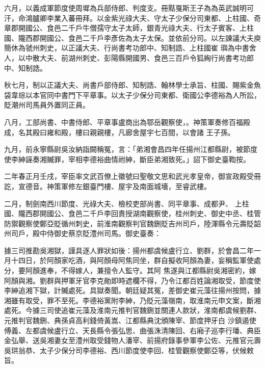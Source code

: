 \begin{pinyinscope}
 六月，以義成軍節度使周墀為兵部侍郎、判度支。冊黠戛斯王子為為英武誠明可汗，命鴻臚卿李業入蕃冊拜。以金紫光祿大夫、守太子少保分司東都、上柱國、奇章郡開國公、食邑二千戶牛僧孺守太子太師，銀青光祿大夫、行太子賓客、上柱國、隴西郡開國公、食邑二千戶李彥佐為太子太保。並依前分司。以左諫議大夫庾簡休為虢州刺史，以正議大夫、行尚書考功郎中、知制誥、上柱國崔
 璵為中書舍人，以中散大夫、前湖州刺史、彭陽縣開國男、食邑三百戶令狐綯行尚書考功郎中、知制誥。



 秋七月，制以正議大夫、尚書戶部侍郎、知制誥、翰林學士承旨、柱國、賜紫金魚袋韋琮以本官同中書門下平章事。以太子少保分司東都、衛國公李德裕為人所訟，貶潮州司馬員外置同正員。



 八月，工部尚書、中書侍郎、平章事盧商出為鄂岳觀察使，。神策軍奏修百福殿成，名其殿曰雍和殿，樓曰親親樓，凡廊舍屋宇七百間，以會諸
 王子孫。



 九月，前永寧縣尉吳汝納詣闕稱冤，言：「弟湘會昌四年任揚州江都縣尉，被節度使李紳誣奏湘贓罪，宰相李德裕曲情祔紳，斷臣弟湘致死。」詔下御史臺鞫按。



 二年春正月壬戌，宰臣率文武百僚上徽號曰聖敬文思和武光孝皇帝，御宣政殿受冊訖，宣德音。神策軍修左銀臺門樓、屋宇及南面城墻，至睿武樓。



 二月，制劍南西川節度、光祿大夫、檢校吏部尚書、同平章事、成都尹、
 上柱國、隴西郡開國公、食邑二千戶李回責授湖南觀察使，桂州刺史、御史中丞、桂管防禦觀察使鄭亞貶循州刺史，前淮南觀察判官魏鉶貶吉州司戶，陸渾縣令元壽貶韶州司戶，殿中侍御史蔡京貶澧州司馬。御史臺奏：



 據三司推勘吳湘獄，謹具逐人罪狀如後：揚州都虞候盧行立、劉群，於會昌二年一月十四日，於阿顏家吃酒，與阿顏母阿焦同坐，群自擬收阿顏為妻，妄稱監軍使處分，要阿顏進奉，不得嫁人，兼擅令人監守。其阿
 焦遂與江都縣尉吳湘密約，嫁阿顏與湘。劉群與押軍牙官李克勛即時遮欄不得，乃令江都百姓論湘取受，節度使李紳追湘下獄，計贓處死。具獄奏聞。朝廷疑其冤，差御史崔元藻往揚州按問，據湘雖有取受，罪不至死。李德裕黨附李紳，乃貶元藻嶺南，取淮南元申文案，斷湘處死。今據三司使追崔元藻及淮南元推判官魏鉶並關連人款狀，淮南都虞候劉群、元推判官魏鉶、典孫貞高利錢倚黃嵩、江都縣典沈頒陳宰、節度押牙白
 沙鎮遏使傅義、左都虞候盧行立、天長縣令張弘思、曲張洙清陳回、右廂子巡李行璠、典臣金弘舉、送吳湘妻女至澧州取受錢物人潘宰、前揚府錄事參軍李公佐、元推官元壽吳珙翁恭、太子少保分司李德裕、西川節度使李回、桂管觀察使鄭亞等，伏候敕旨。




\end{pinyinscope}

